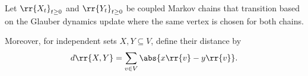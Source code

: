 \documentclass{article}
\begin{document}
Let $\rr{X_t}_{t\geq 0}$ and $\rr{Y_t}_{t\geq 0}$ be coupled Markov chains that transition
based on the Glauber dynamics update where the same vertex is chosen for both chains.

Moreover, for independent sets $X,Y\subseteq V$, define their distance by
\begin{align*}
  d\rr{X,Y} = \sum_{v\in V} \abs{x\rr{v}-y\rr{v}}.
\end{align*}

\begin{claim*}[3]
\end{claim*}
\end{document}
